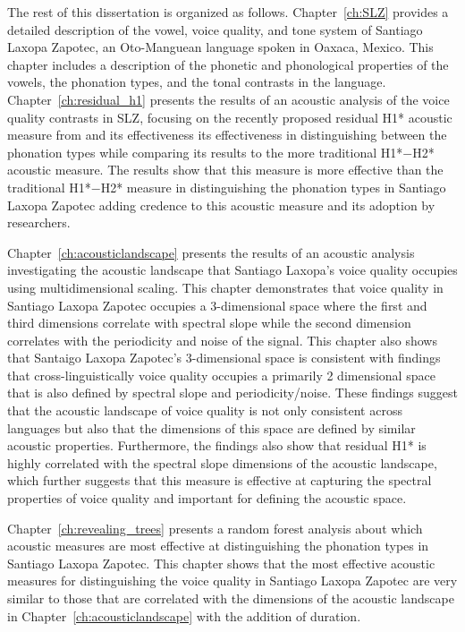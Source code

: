 The rest of this dissertation is organized as follows. Chapter~\ref{ch:SLZ} provides a detailed description of the vowel, voice quality, and tone system of Santiago Laxopa Zapotec, an Oto-Manguean language spoken in Oaxaca, Mexico. This chapter includes a description of the phonetic and phonological properties of the vowels, the phonation types, and the tonal contrasts in the language. Chapter~\ref{ch:residual_h1} presents the results of an acoustic analysis of the voice quality contrasts in SLZ, focusing on the recently proposed residual H1* acoustic measure from \citet{chaiH1H2AcousticMeasure2022} and its effectiveness its effectiveness in distinguishing between the phonation types while comparing its results to the more traditional H1*$-$H2* acoustic measure. The results show that this measure is more effective than the traditional H1*$-$H2* measure in distinguishing the phonation types in Santiago Laxopa Zapotec adding credence to this acoustic measure and its adoption by researchers. 

Chapter~\ref{ch:acousticlandscape} presents the results of an acoustic analysis investigating the acoustic landscape that Santiago Laxopa's voice quality occupies using multidimensional scaling. This chapter demonstrates that voice quality in Santiago Laxopa Zapotec occupies a 3-dimensional space where the first and third dimensions correlate with spectral slope while the second dimension correlates with the periodicity and noise of the signal. This chapter also shows that Santaigo Laxopa Zapotec's 3-dimensional space is consistent with  findings that cross-linguistically voice quality occupies a primarily 2 dimensional space that is also defined by spectral slope and periodicity/noise. These findings suggest that the acoustic landscape of voice quality is not only consistent across languages but also that the dimensions of this space are defined by similar acoustic properties. Furthermore, the findings also show that residual H1* is highly correlated with the spectral slope dimensions of the acoustic landscape, which further suggests that this measure is effective at capturing the spectral properties of voice quality and important for defining the acoustic space.

Chapter~\ref{ch:revealing_trees} presents a random forest analysis about which acoustic measures are most effective at distinguishing the phonation types in Santiago Laxopa Zapotec. This chapter shows that the most effective acoustic measures for distinguishing the voice quality in Santiago Laxopa Zapotec are very similar to those that are correlated with the dimensions of the acoustic landscape in Chapter~\ref{ch:acousticlandscape} with the addition of duration. 

